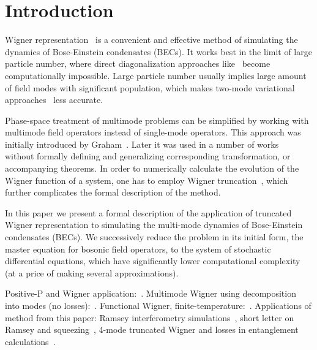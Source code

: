 \section{Introduction}


Wigner representation~\cite{Gardiner2004} is a convenient and effective method of simulating the dynamics of Bose-Einstein condensates (BECs).
It works best in the limit of large particle number, where direct diagonalization approaches like~\cite{Sakmann2009} become computationally impossible.
Large particle number usually implies large amount of field modes with significant population, which makes two-mode variational approaches~\cite{Li2008,Li2009,Sinatra2011} less accurate.

Phase-space treatment of multimode problems can be simplified by working with multimode field operators instead of single-mode operators.
This approach was initially introduced by Graham~\cite{Graham1970,Graham1970a}.
Later it was used in a number of works~\cite{Steel1998,Isella2006,Norrie2006a} without formally defining and generalizing corresponding transformation, or accompanying theorems.
In order to numerically calculate the evolution of the Wigner function of a system, one has to employ Wigner truncation~\cite{Drummond1993,Steel1998,Sinatra2002}, which further complicates the formal description of the method.

In this paper we present a formal description of the application of truncated Wigner representation to simulating the multi-mode dynamics of Bose-Einstein condensates (BECs).
We successively reduce the problem in its initial form, the master equation for bosonic field operators, to the system of stochastic differential equations, which have significantly lower computational complexity (at a price of making several approximations).

Positive-P and Wigner application:~\cite{Deuar2007}.
Multimode Wigner using decomposition into modes (no losses):~\cite{Norrie2005,Norrie2006}.
Functional Wigner, finite-temperature:~\cite{Steel1998,Isella2006}.
Applications of method from this paper: Ramsey interferometry simulations~\cite{Egorov2011}, short letter on Ramsey and squeezing~\cite{Opanchuk2012}, 4-mode truncated Wigner and losses in entanglement calculations~\cite{Opanchuk2012a}.
